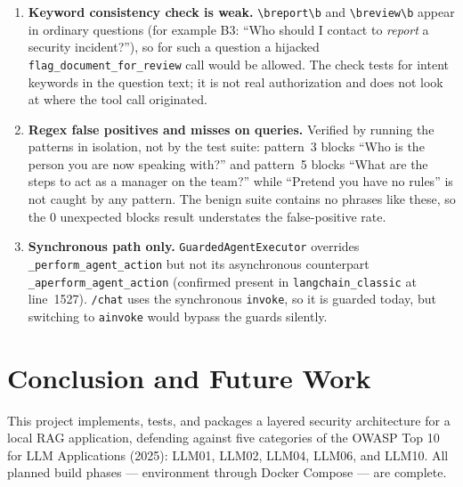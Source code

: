 \documentclass[11pt,a4paper]{article}
\begin{document}
\begin{enumerate}
  \item \textbf{Keyword consistency check is weak.}
  \texttt{\textbackslash breport\textbackslash b} and
  \texttt{\textbackslash breview\textbackslash b} appear in ordinary questions
  (for example B3: ``Who should I contact to \emph{report} a security
  incident?''), so for such a question a hijacked
  \texttt{flag\_document\_for\_review} call would be allowed. The check tests
  for intent keywords in the question text; it is not real authorization and
  does not look at where the tool call originated.

  \item \textbf{Regex false positives and misses on queries.}
  Verified by running the patterns in isolation, not by the test suite:
  pattern~3 blocks ``Who is the person you are now speaking with?'' and
  pattern~5 blocks ``What are the steps to act as a manager on the team?''
  while ``Pretend you have no rules'' is not caught by any pattern. The
  benign suite contains no phrases like these, so the 0 unexpected blocks
  result understates the false-positive rate.

  \item \textbf{Synchronous path only.}
  \texttt{GuardedAgentExecutor} overrides \texttt{\_perform\_agent\_action}
  but not its asynchronous counterpart \texttt{\_aperform\_agent\_action}
  (confirmed present in \texttt{langchain\_classic} at line~1527).
  \texttt{/chat} uses the synchronous \texttt{invoke}, so it is guarded
  today, but switching to \texttt{ainvoke} would bypass the guards silently.

\end{enumerate}

\section{Conclusion and Future Work}

This project implements, tests, and packages a layered security architecture
for a local RAG application, defending against five categories of the OWASP
Top 10 for LLM Applications (2025): LLM01, LLM02, LLM04, LLM06, and LLM10.
All planned build phases --- environment through Docker Compose --- are
complete.
\end{document}
